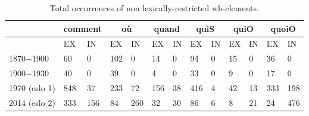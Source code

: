 \documentclass[fleqn,10pt]{wlscirep}
\begin{document}
\begin{table}[H]
    \centering
    \small
    \begin{adjustbox}{width=\textwidth}
        \begin{tabular}{l|ll|ll|ll|ll|ll|ll}
        {} & \multicolumn{2}{c}{comment}  & \multicolumn{2}{c}{où} & \multicolumn{2}{c}{quand}& \multicolumn{2}{c}{quiS} & \multicolumn{2}{c}{quiO}& \multicolumn{2}{c}{quoiO}\\
        \hline
        {} & EX & IN & EX & IN & EX & IN & EX & IN & EX & IN & EX & IN\\
        1870$-$1900 & 60 & 0 & 102 & 0 & 14 & 0 & 94 & 0 & 15 & 0 & 36 & 0\\
        1900$-$1930 & 40 & 0 & 39 & 0 & 4 & 0 & 33 & 0 & 9 & 0 & 17 & 0\\
        1970 (eslo 1) & 848 & 37 & 233 & 72 & 156 & 38 & 416 & 4 & 42 & 13 & 333 & 198\\
        2014 (eslo 2) & 333 & 156 & 84 & 260 & 32 & 30 & 86 & 6 & 8 & 21 & 24 & 476 \\
        \hline
        \end{tabular}
    \end{adjustbox}
\caption{\label{tab:samp3}Total occurrences of non lexically-restricted wh-elements.}
\end{table}
\end{document}
